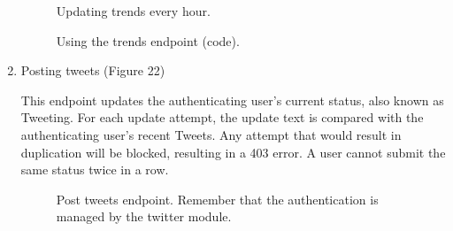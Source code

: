 \documentclass[12pt]{article} %
\begin{document}
\begin{enumerate}
		\begin{figure}[H] %
		\caption{Updating trends every hour.}
		\label{trendsInterval}
		\end{figure}

		\begin{figure}[H] %
		\caption{Using the trends endpoint (code).}
		\label{trendsAPI}
		\end{figure}
		
		\item Posting tweets (Figure 22)

		This endpoint updates the authenticating user’s current status, also known as Tweeting.
		For each update attempt, the update text is compared with the authenticating user’s recent Tweets. 
		Any attempt that would result in duplication will be blocked, resulting in a 403 error. A user cannot submit the same status twice in a row.

		\begin{figure}[H] %
		\caption{Post tweets endpoint. Remember that the authentication is managed by the twitter module.}
		\label{tweetEndpoint}
		\end{figure}


\end{enumerate}
\end{document}
